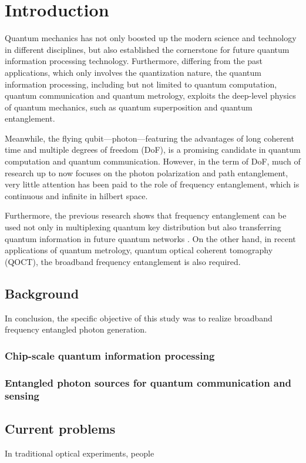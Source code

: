 \chapter{Introduction}
Quantum mechanics has not only boosted up the modern science and technology in different disciplines, but also established the cornerstone for future quantum information processing technology. Furthermore, differing from the past applications, which only involves the quantization nature, the quantum information processing, including but not limited to  quantum computation, quantum communication and quantum metrology, exploits the deep-level physics of quantum mechanics, such as quantum superposition and quantum entanglement.

Meanwhile, the flying qubit---photon---featuring the advantages of long coherent time and multiple degrees of freedom (DoF), is a promising candidate in quantum computation and quantum communication. However, in the term of DoF, much of research up to now focuses on the photon polarization and path entanglement, very little attention has been paid to the role of frequency entanglement, which is continuous and infinite in hilbert space. 

Furthermore, the previous research shows that frequency entanglement can be used not only in multiplexing quantum key distribution \cite{Wengerowsky2018} but also transferring quantum information in future quantum networks \cite{Tchebotareva2019}. On the other hand, in recent applications of quantum metrology, quantum optical coherent tomography (QOCT), the broadband frequency entanglement \cite{Okano2015} is also required. 


\section{Background}

In conclusion, the specific objective of this study was to realize broadband frequency entangled photon generation. 


\subsection{Chip-scale quantum information processing}
\subsection{Entangled photon sources for quantum communication and sensing}

\section{Current problems}

In traditional optical experiments, people